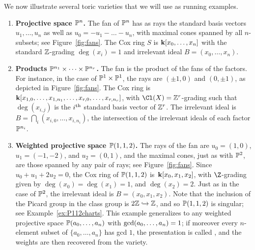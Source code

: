 \documentclass{amsart}
\begin{document}
\begin{example}\label{ex:toricrunning}
  We now illustrate several toric varieties that we will use as running examples.
  \begin{enumerate}
  \item \textbf{Projective space $\mathbb P^n$.}  The fan of $\mathbb P^n$ has as rays the standard basis vectors $u_1,\dots,u_n$ as well as $u_0 = -u_1-\dots-u_n$, with maximal cones spanned by all $n$-subsets; see Figure~\ref{fig:fans}. The Cox ring $S$ is ${\bf k}[x_0,\dots,x_n]$ with the standard $\mathbb Z$-grading $\deg(x_i) = 1$ and irrelevant ideal $B = (x_0,\dots,x_n)$.

  \item \textbf{Products $\mathbb P^{n_1}\times\dots\times\mathbb P^{n_r}$.} The fan is the product of the fans of the factors. For instance, in the case of $\mathbb P^1 \times \mathbb P^1$, the rays are $(\pm 1, 0)$ and $(0, \pm 1)$, as depicted in Figure~\ref{fig:fans}. The Cox ring
  is $\mathbf{k}[x_{1,0}, \dots, x_{1,n_1}, \dots, x_{r,0}, \dots, x_{r,n_r}]$, with $\Cl(X) = \ZZ^r$-grading such that $\deg(x_{i, j})$ is the $i^{\operatorname{th}}$ standard basis vector of $\mathbb Z^r$. The irrelevant ideal is $B = \bigcap_i (x_{i,0},\dots,x_{i,n_i})$, the intersection of the irrelevant ideals of each factor $\mathbb P^{n_i}$.

  \item \textbf{Weighted projective space $\mathbb P(1,1,2)$.} The rays of the fan are $u_0 = (1,0)$, $u_1 = (-1,-2)$, and $u_2 = (0,1)$, and the maximal cones, just as with $\mathbb P^2$, are those spanned by any pair of rays; see Figure~\ref{fig:fans}. Since $u_0 + u_1 + 2u_2 = 0$, the Cox ring of $\mathbb P(1,1,2)$ is~${\bf k}[x_0, x_1, x_2]$, with $\Z$-grading given by $\deg(x_0) = \deg(x_1) = 1$, and $\deg(x_2) = 2$. Just as in the case of $\mathbb P^2$, the irrelevant ideal is $B = (x_0, x_1, x_2)$. Note that the inclusion of the Picard group in the class group is $2\mathbb Z \xhookrightarrow{} \mathbb Z$, and so $\mathbb P(1,1,2)$ is singular; see Example~\ref{ex:P112charts}. This example generalizes to any weighted projective space $\mathbb P(a_0, \dots, a_n)$ with $\operatorname{gcd}(a_0, \dots, a_n) = 1$; if moreover every $n$-element subset of $\{a_0,\dots,a_n\}$ has gcd $1$, the presentation is called , and the weights are then recovered from the variety.



\end{enumerate}
\end{example}
\end{document}
